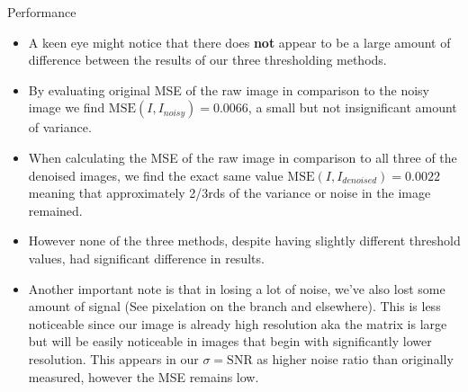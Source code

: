 \documentclass[aspectratio=169,xcolor=dvipsnames]{beamer}
\begin{document}
	\begin{frame}{Performance}
		\begin{itemize}
			\item A keen eye might notice that there does \textbf{not} appear to be a large amount of difference between the results of our three thresholding methods.
			\item By evaluating original MSE of the raw image in comparison to the noisy image we find $\text{MSE}(I, I_{noisy}) = 0.0066$, a small but not insignificant amount of variance.
			\item When calculating the MSE of the raw image in comparison to all three of the denoised images, we find the exact same value $\text{MSE}(I, I_{denoised}) = 0.0022$ meaning that approximately 2/3rds of the variance or noise in the image remained. 
			\item However none of the three methods, despite having slightly different threshold values, had significant difference in results.
			\item Another important note is that in losing a lot of noise, we've also lost some amount of signal (See pixelation on the branch and elsewhere). This is less noticeable since our image is already high resolution aka the matrix is large but will be easily noticeable in images that begin with significantly lower resolution. This appears in our $\sigma = \text{SNR}$ as higher noise ratio than originally measured, however the MSE remains low.
			
		\end{itemize}
	\end{frame}

	
\end{document}
